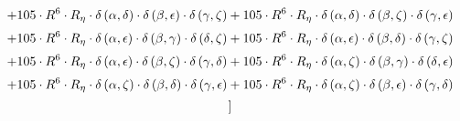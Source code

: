 \begin{subequations}
\begin{gather}
 \\[0.2em] \notag 		 + 105 \cdot R^{6} \cdot R_{\eta{}} \cdot \delta{}\left(\alpha{}, \delta{}\right) \cdot \delta{}\left(\beta{}, \epsilon{}\right) \cdot \delta{}\left(\gamma{}, \zeta{}\right)+ 105 \cdot R^{6} \cdot R_{\eta{}} \cdot \delta{}\left(\alpha{}, \delta{}\right) \cdot \delta{}\left(\beta{}, \zeta{}\right) \cdot \delta{}\left(\gamma{}, \epsilon{}\right) 
 \\[0.2em] \notag 		 + 105 \cdot R^{6} \cdot R_{\eta{}} \cdot \delta{}\left(\alpha{}, \epsilon{}\right) \cdot \delta{}\left(\beta{}, \gamma{}\right) \cdot \delta{}\left(\delta{}, \zeta{}\right)+ 105 \cdot R^{6} \cdot R_{\eta{}} \cdot \delta{}\left(\alpha{}, \epsilon{}\right) \cdot \delta{}\left(\beta{}, \delta{}\right) \cdot \delta{}\left(\gamma{}, \zeta{}\right) 
 \\[0.2em] \notag 		 + 105 \cdot R^{6} \cdot R_{\eta{}} \cdot \delta{}\left(\alpha{}, \epsilon{}\right) \cdot \delta{}\left(\beta{}, \zeta{}\right) \cdot \delta{}\left(\gamma{}, \delta{}\right)+ 105 \cdot R^{6} \cdot R_{\eta{}} \cdot \delta{}\left(\alpha{}, \zeta{}\right) \cdot \delta{}\left(\beta{}, \gamma{}\right) \cdot \delta{}\left(\delta{}, \epsilon{}\right) 
 \\[0.2em] \notag 		 + 105 \cdot R^{6} \cdot R_{\eta{}} \cdot \delta{}\left(\alpha{}, \zeta{}\right) \cdot \delta{}\left(\beta{}, \delta{}\right) \cdot \delta{}\left(\gamma{}, \epsilon{}\right)+ 105 \cdot R^{6} \cdot R_{\eta{}} \cdot \delta{}\left(\alpha{}, \zeta{}\right) \cdot \delta{}\left(\beta{}, \epsilon{}\right) \cdot \delta{}\left(\gamma{}, \delta{}\right)\\[0.2em] \notag ]
\end{gather}\end{subequations}
